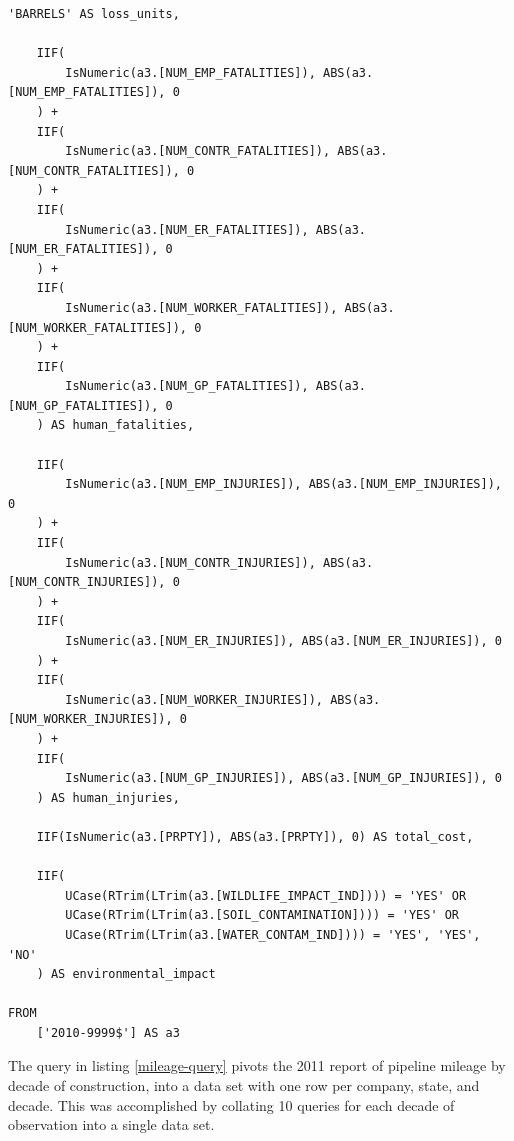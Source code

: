 \documentclass[letterpaper,10pt,oneside,final,onecolumn]{article}
\begin{document}
\begin{lstlisting}[label=accident-query,caption={\textit{JetSQL} statement to collate pipeline accidents into a single data set}]
	'BARRELS' AS loss_units,

	IIF(
		IsNumeric(a3.[NUM_EMP_FATALITIES]), ABS(a3.[NUM_EMP_FATALITIES]), 0
	) +
	IIF(
		IsNumeric(a3.[NUM_CONTR_FATALITIES]), ABS(a3.[NUM_CONTR_FATALITIES]), 0
	) +
	IIF(
		IsNumeric(a3.[NUM_ER_FATALITIES]), ABS(a3.[NUM_ER_FATALITIES]), 0
	) +
	IIF(
		IsNumeric(a3.[NUM_WORKER_FATALITIES]), ABS(a3.[NUM_WORKER_FATALITIES]), 0
	) +
	IIF(
		IsNumeric(a3.[NUM_GP_FATALITIES]), ABS(a3.[NUM_GP_FATALITIES]), 0
	) AS human_fatalities,

	IIF(
		IsNumeric(a3.[NUM_EMP_INJURIES]), ABS(a3.[NUM_EMP_INJURIES]), 0
	) +
	IIF(
		IsNumeric(a3.[NUM_CONTR_INJURIES]), ABS(a3.[NUM_CONTR_INJURIES]), 0
	) +
	IIF(
		IsNumeric(a3.[NUM_ER_INJURIES]), ABS(a3.[NUM_ER_INJURIES]), 0
	) +
	IIF(
		IsNumeric(a3.[NUM_WORKER_INJURIES]), ABS(a3.[NUM_WORKER_INJURIES]), 0
	) +
	IIF(
		IsNumeric(a3.[NUM_GP_INJURIES]), ABS(a3.[NUM_GP_INJURIES]), 0
	) AS human_injuries,

	IIF(IsNumeric(a3.[PRPTY]), ABS(a3.[PRPTY]), 0) AS total_cost,

	IIF(
		UCase(RTrim(LTrim(a3.[WILDLIFE_IMPACT_IND]))) = 'YES' OR 
		UCase(RTrim(LTrim(a3.[SOIL_CONTAMINATION]))) = 'YES' OR
		UCase(RTrim(LTrim(a3.[WATER_CONTAM_IND]))) = 'YES', 'YES', 'NO'
	) AS environmental_impact

FROM
	['2010-9999$'] AS a3
	\end{lstlisting}

	The query in listing \ref{mileage-query} pivots the 2011 report of pipeline mileage by decade of construction, into a data set with one row per company, state, and decade.
	This was accomplished by collating 10 queries for each decade of observation into a single data set.
\end{document}
